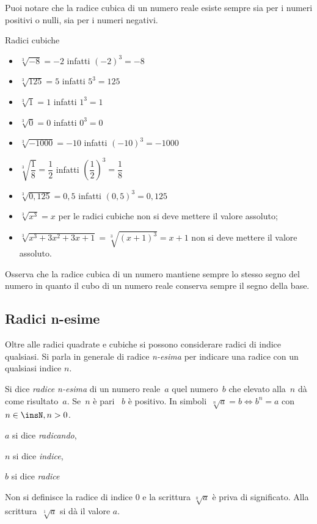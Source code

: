 Puoi notare che la radice cubica di un numero reale esiste sempre sia per 
i numeri positivi o nulli, sia per i numeri negativi.

\begin{exrig}
\begin{esempio}
Radici cubiche
 \begin{multicols}{2}
 \begin{itemize}
\item \(\sqrt[3]{-8}=-2\) infatti \(\left(-2\right)^3=-8\)
\item \(\sqrt[3]{125}=5\) infatti \(5^3=125\)
\item \(\sqrt[3]1=1\) infatti \(1^3=1\)
\item \(\sqrt[3]0=0\) infatti \(0^3=0\)
\item \(\sqrt[3]{-1000}=-10\) infatti \(\left(-10\right)^3=-1000\)
\item \(\sqrt[3]{\dfrac 1 8}=\dfrac 1 2\) infatti 
  \(\left(\dfrac 1 2\right)^3=\dfrac 1 8\)
\item \(\sqrt[3]{0,125}=0,5\) infatti \((0,5)^3=0,125\)
\item \(\sqrt[3]{x^3}=x\) per le radici cubiche non si deve mettere 
  il valore assoluto;
\item \(\sqrt[3]{x^3+3x^2+3x+1}=\sqrt[3]{(x+1)^3}=x+1\) non si deve mettere 
  il valore assoluto.
\end{itemize}
\end{multicols}
\end{esempio}
\end{exrig}

Osserva che la radice cubica di un numero mantiene sempre lo stesso segno del 
numero in quanto il cubo di un numero reale conserva sempre il segno della 
base.

\subsection{Radici n-esime}
Oltre alle radici quadrate e cubiche si possono considerare radici di indice 
qualsiasi. 
Si parla in generale di radice \emph{n-esima} per indicare una radice con un 
qualsiasi indice \(n\).

\begin{definizione}
Si dice \emph{radice n-esima} di un numero reale~\(a\) quel numero~\(b\) che 
elevato alla~\(n\) dà come risultato~\(a\). Se~\(n\) è pari ~\(b\) è positivo.
In simboli~\(\sqrt[n]a=b \Leftrightarrow b^n=a\) con \(n\in \insN, n > 0\).

\(a\) si dice \emph{radicando}, 

\(n\) si dice \emph{indice}, 

\(b\) si dice \emph{radice}

Non si definisce la radice di indice \(0\) e la scrittura \(\sqrt[0]a\) è priva 
di significato. Alla scrittura~\(\sqrt[1]a\) si dà il valore \(a\).
\end{definizione}

